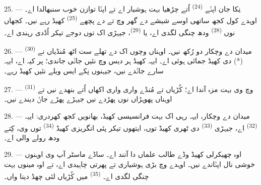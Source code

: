 25. --- نِکا جان اپݨے  \textsuperscript{(24)} اُتے چڑھیا بہت
ہوشیار اے تے اپݨا توازن خوب سنبھالدا اے۔ اوہدے کول کجھ ساتھی اوسے شیشے دے گھر
وچ تے  دے پچھے  \textsuperscript{(25)} کھیڈ رہے
نیں۔ کجھاں نوں  \textsuperscript{(28)} ودھ چنگی لگدی اے، یا
 \textsuperscript{(29)}، جیہڑی اک  توں دوجے تیکر اُڈدی
رہندی اے۔


26. --- میدان دے وچکار دو رُکھ نیں۔ اوہناں وچوں اک دے تھلے ست اٹھ مُنڈیاں نے
 \textsuperscript{(30)} (*) دی کھیڈ جمائی ہوئی اے۔ ایہہ کھیڈ ہر
دیس وچ نئیں جاݨی جاندی؛ پر  کیہ اے، ایہہ سارے جاݨدے نیں،
جیہنوں نِکے ایس ویلے نئیں کھیڈ رہے۔

\VUsaut{5.0mm}
\VUsaut{3.4mm}

27. ---  \textsuperscript{(31)} وچ وی بہت مزہ آندا اے؛ کُڑیاں
تے مُنڈے واری واری اکھاں اُتے  بنھدے نیں تے اوہناں پھوہڑاں نوں
پھڑدے نیں جیہڑے پھڑے جاݨ دیندے نیں۔

28. --- میدان دے وچکار، ایہہ رہی اک بہت فرانسیسی کھیڈ، بھانویں کجھ کھردری:
ایہہ  \textsuperscript{(32)} اے، جیہڑی 
\textsuperscript{(33)} دی ٹھری کھیڈ توں، ایتھوں تیکر پئی انگریزی کھیڈ
 \textsuperscript{(34)} توں وی، کِتے ودھ رولے والی اے۔

29. --- اوہ چھیکرلی کھیڈ وڈے طالب علماں دا آنند اے۔ ساڈے ماسٹر آپ وی اوہنوں
خوشی نال اپݨاندے نیں۔ اوہدے وچ بڑی ہوشیاری تے پھرتی چاہیدی اے، تے اوہ مینوں
بہت چنگی لگدی اے۔  \textsuperscript{(35)} میں کُڑیاں لئی چھڈ دینا
واں۔

